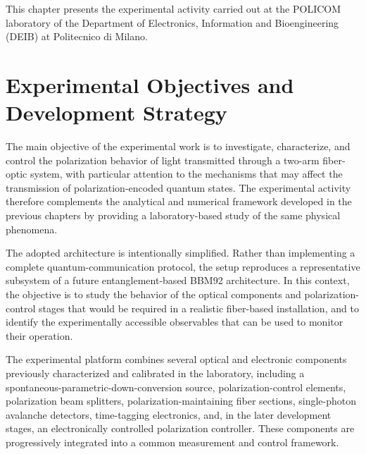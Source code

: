 
This chapter presents the experimental activity carried out at the POLICOM
laboratory of the Department of Electronics, Information and Bioengineering
(DEIB) at Politecnico di Milano.



\section{Experimental Objectives and Development Strategy}
\label{sec:experimental_objectives}

The main objective of the experimental work is to investigate, characterize, and
control the polarization behavior of light transmitted through a two-arm
fiber-optic system, with particular attention to the mechanisms that may affect
the transmission of polarization-encoded quantum states. The experimental
activity therefore complements the analytical and numerical framework developed
in the previous chapters by providing a laboratory-based study of the same
physical phenomena.

The adopted architecture is intentionally simplified. Rather than implementing
a complete quantum-communication protocol, the setup reproduces a representative
subsystem of a future entanglement-based BBM92 architecture. In this
context, the objective is to study the behavior of the optical components and
polarization-control stages that would be required in a realistic fiber-based
installation, and to identify the experimentally accessible observables that can
be used to monitor their operation.

The experimental platform combines several optical and electronic components
previously characterized and calibrated in the laboratory, including a
spontaneous-parametric-down-conversion source, polarization-control elements,
polarization beam splitters, polarization-maintaining fiber sections,
single-photon avalanche detectors, time-tagging electronics, and, in the later
development stages, an electronically controlled polarization controller. These
components are progressively integrated into a common measurement and control
framework.

